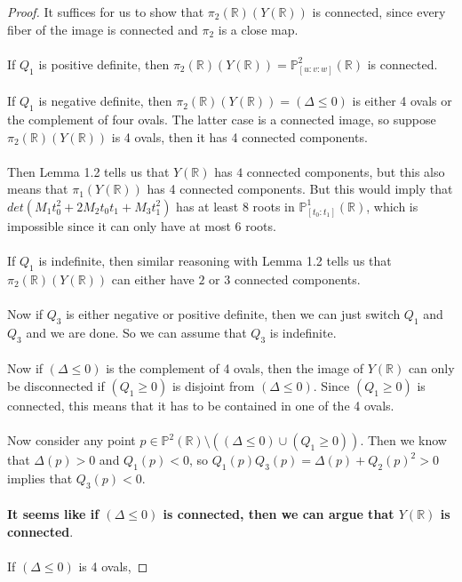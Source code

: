 \documentclass{article}
\newcommand{\Rbb}{\mathbb{R}}
\newcommand{\Pbb}{\mathbb{P}}
\begin{document}
\begin{proof}
It suffices for us to show that $\pi_2(\Rbb)(Y(\Rbb))$ is connected, since every fiber of the image is connected and $\pi_2$ is a close map.\\\\
If $Q_1$ is positive definite, then $\pi_2(\Rbb)(Y(\Rbb)) = \Pbb^2_{[u:v:w]}(\Rbb)$ is connected.\\\\
If $Q_1$ is negative definite, then $\pi_2(\Rbb)(Y(\Rbb)) = (\Delta \leq 0)$ is either 4 ovals or the complement of four ovals. The latter case is a connected image, so suppose $\pi_2(\Rbb)(Y(\Rbb))$ is 4 ovals, then it has 4 connected components.\\\\
Then Lemma 1.2 tells us that $Y(\Rbb)$ has $4$ connected components, but this also means that $\pi_1(Y(\Rbb))$ has 4 connected components. But this would imply that $det(M_1t_0^2 + 2M_2t_0t_1 + M_3t_1^2)$ has at least $8$ roots in $\Pbb^1_{[t_0:t_1]}(\Rbb)$, which is impossible since it can only have at most $6$ roots.\\\\
If $Q_1$ is indefinite, then similar reasoning with Lemma 1.2 tells us that $\pi_2(\Rbb)(Y(\Rbb))$ can either have $2$ or $3$ connected components.\\\\
Now if $Q_3$ is either negative or positive definite, then we can just switch $Q_1$ and $Q_3$ and we are done. So we can assume that $Q_3$ is indefinite.\\\\
Now if $(\Delta \leq 0)$ is the complement of 4 ovals, then the image of $Y(\Rbb)$ can only be disconnected if $(Q_1 \geq 0)$ is disjoint from $(\Delta \leq 0)$. Since $(Q_1 \geq 0)$ is connected, this means that it has to be contained in one of the 4 ovals.\\\\
Now consider any point $p \in \Pbb^2(\Rbb) \setminus ((\Delta \leq 0) \cup (Q_1 \geq 0))$. Then we know that $\Delta(p) > 0$ and $Q_1(p) < 0$, so $Q_1(p)Q_3(p) = \Delta(p) + Q_2(p)^2 > 0$ implies that $Q_3(p) < 0$.\\\\
{\bf It seems like if $(\Delta \leq 0)$ is connected, then we can argue that $Y(\Rbb)$ is connected}.\\\\
If $(\Delta \leq 0)$ is 4 ovals, 
\end{proof}
\end{document}

